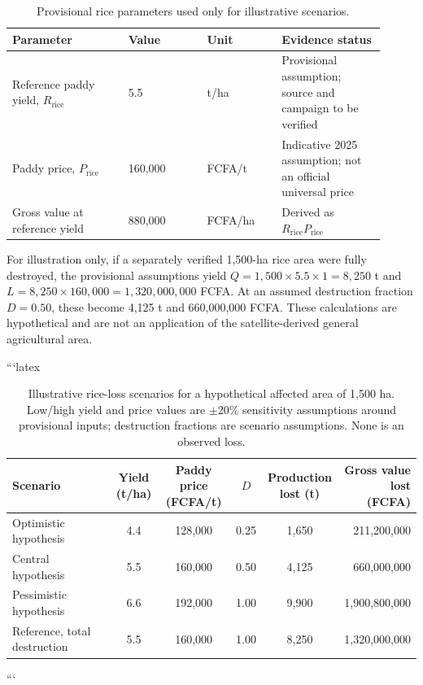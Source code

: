 \documentclass[pdflatex,sn-mathphys,Numbered]{sn-jnl}
\begin{document}
\begin{table}[t]
\centering
\caption{Provisional rice parameters used only for illustrative scenarios.}
\label{tab:rice-parameters}
\begin{tabular}{p{0.29\linewidth}p{0.19\linewidth}p{0.18\linewidth}p{0.25\linewidth}}
\toprule
Parameter & Value & Unit & Evidence status \\
\midrule
Reference paddy yield, $R_{\mathrm{rice}}$ & 5.5 & t/ha & Provisional assumption; source and campaign to be verified \\
Paddy price, $P_{\mathrm{rice}}$ & 160,000 & FCFA/t & Indicative 2025 assumption; not an official universal price \\
Gross value at reference yield & 880,000 & FCFA/ha & Derived as $R_{\mathrm{rice}}P_{\mathrm{rice}}$ \\
\bottomrule
\end{tabular}
\end{table}

For illustration only, if a separately verified 1,500-ha rice area were fully destroyed, the provisional assumptions yield $Q=1{,}500\times5.5\times1=8{,}250$ t and $L=8{,}250\times160{,}000=1{,}320{,}000{,}000$ FCFA. At an assumed destruction fraction $D=0.50$, these become 4,125 t and 660,000,000 FCFA. These calculations are hypothetical and are not an application of the satellite-derived general agricultural area.

```latex
\begin{table}[t]
\centering
\caption{Illustrative rice-loss scenarios for a hypothetical affected area of 1,500 ha. Low/high yield and price values are $\pm20\%$ sensitivity assumptions around provisional inputs; destruction fractions are scenario assumptions. None is an observed loss.}
\label{tab:rice-loss-scenarios}
\small
\setlength{\tabcolsep}{3pt}
\renewcommand{\arraystretch}{1.15}
\begin{tabularx}{\textwidth}{@{}X c c c c r@{}}
\toprule
Scenario &
\makecell{Yield\\(t/ha)} &
\makecell{Paddy price\\(FCFA/t)} &
$D$ &
\makecell{Production\\lost (t)} &
\makecell{Gross value\\lost (FCFA)} \\
\midrule
Optimistic hypothesis & 4.4 & 128,000 & 0.25 & 1,650 & 211,200,000 \\
Central hypothesis & 5.5 & 160,000 & 0.50 & 4,125 & 660,000,000 \\
Pessimistic hypothesis & 6.6 & 192,000 & 1.00 & 9,900 & 1,900,800,000 \\
Reference, total destruction & 5.5 & 160,000 & 1.00 & 8,250 & 1,320,000,000 \\
\bottomrule
\end{tabularx}
\end{table}
```
\end{document}
